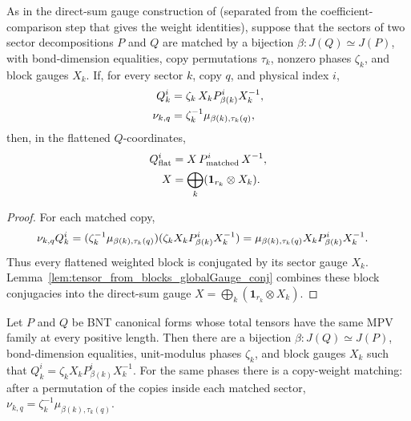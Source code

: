\begin{lemma}%
    \label{thm:sector_bnt_global_gauge_of_matched_weights}
    \leanok
    As in the direct-sum gauge construction of
    \cite[Appendix MPV proof, lines~1189--1192]{Cirac2016MPDO_arXiv}
    (separated from the coefficient-comparison step that gives the weight
    identities), suppose that the sectors of two sector decompositions $P$ and
    $Q$ are matched by a bijection $\beta:J(Q)\simeq J(P)$, with
    bond-dimension equalities, copy permutations $\tau_k$, nonzero phases
    $\zeta_k$, and block gauges $X_k$. If, for every sector $k$, copy $q$, and
    physical index $i$,
    \begin{align}
        Q_k^i
         & = \zeta_k\,X_k P_{\beta(k)}^i X_k^{-1},
        \notag                                      \\
        \nu_{k,q}
         & = \zeta_k^{-1} \mu_{\beta(k),\tau_k(q)},
        \label{eq:ft_matched_weights_hypotheses}
    \end{align}
    then, in the flattened $Q$-coordinates,
    \begin{align}
        Q_{\mathrm{flat}}^i
         & = X\,P_{\mathrm{matched}}^i\,X^{-1},
        \notag                                         \\
        X
         & = \bigoplus_k(\mathbf{1}_{r_k}\otimes X_k).
        \notag
    \end{align}
\end{lemma}

\begin{proof}\leanok
    For each matched copy,
    \begin{align}
        \nu_{k,q}Q_k^i
         & = (\zeta_k^{-1}\mu_{\beta(k),\tau_k(q)})
        (\zeta_kX_kP_{\beta(k)}^iX_k^{-1})
        = \mu_{\beta(k),\tau_k(q)}X_kP_{\beta(k)}^iX_k^{-1}.
        \notag
    \end{align}
    Thus every flattened weighted block is conjugated by its sector gauge
    $X_k$. Lemma~\ref{lem:tensor_from_blocks_globalGauge_conj} combines these
    block conjugacies into the direct-sum gauge
    $X=\bigoplus_k(\mathbf{1}_{r_k}\otimes X_k)$.
\end{proof}

\begin{lemma}%
    \label{lem:sector_bnt_equal_matched_copy_weight_witnesses}
    \leanok
    Let $P$ and $Q$ be BNT canonical forms whose total tensors have the same
    MPV family at every positive length. Then there are a bijection
    $\beta:J(Q)\simeq J(P)$, bond-dimension equalities, unit-modulus phases
    $\zeta_k$, and block gauges $X_k$ such that
    $Q_k^i=\zeta_k X_kP_{\beta(k)}^iX_k^{-1}$.
    For the same phases there is a copy-weight matching: after a permutation
    of the copies inside each matched sector,
    $\nu_{k,q}=\zeta_k^{-1}\mu_{\beta(k),\tau_k(q)}$.
\end{lemma}

